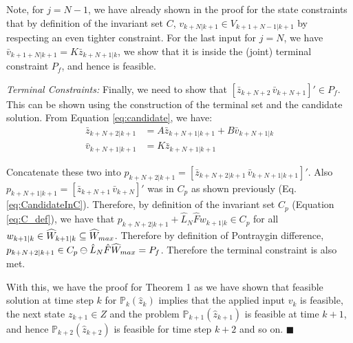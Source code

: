 Note,  for $j=N-1$, we have already shown in the proof for the state constraints that by definition of the invariant set $C$, $v_{k+N|k+1} \in {V}_{k+1+N-1|k+1}$ by respecting an even tighter constraint.
For the last input for $j=N$, we have $\bar{v}_{k+1+N|k+1}=K\bar{z}_{k+N+1|k}$, we show that it is inside the (joint) terminal constraint $P_f$, and hence is feasible.

\textit{Terminal Constraints:} Finally, we need to show that $[\bar{z}_{k+N+2} \, \bar{v}_{k+N+1}]' \in P_f$. This can be shown using the construction of the terminal set and the candidate solution. From Equation \ref{eq:candidate}, we have:
\begin{subequations}
\begin{align}
\bar{z}_{k+N+2|k+1}&=A\bar{z}_{k+N+1|k+1} + B\bar{v}_{k+N+1|k} \\
\bar{v}_{k+N+1|k+1}&=K\bar{z}_{k+N+1|k+1}
\end{align}
\end{subequations}

Concatenate these two into $p_{k+N+2|k+1} = [\bar{z}_{k+N+2|k+1}\, \bar{v}_{k+N+1|k+1}]'$. Also $p_{k+N+1|k+1} = [\bar{z}_{k+N+1} \,\bar{v}_{k+N}]'$ was in $C_p$ as shown previously (Eq. \ref{eq:CandidateInC}). Therefore, by definition of the invariant set $C_p$ (Equation \ref{eq:C_def}), we have that $p_{k+N+2|k+1} + \hat{L}_N \hat{F} w_{k+1|k}\in C_p$ for all $w_{k+1|k}\in \widehat{W}_{k+1|k} \subseteq \widehat{W}_{max}$. Therefore by definition of Pontraygin difference, $p_{k+N+2|k+1} \in C_p \ominus \hat{L}_N\hat{F}\widehat{W}_{max} = P_f$. Therefore the terminal constraint is also met.

With this, we have the proof for Theorem 1 as we have shown that feasible solution at time step $k$ for $\mathbb{P}_{k}(\hat{z}_{k}) $ implies that the applied input $v_k$ is feasible, the next state $z_{k+1} \in Z$ and the problem $\mathbb{P}_{k+1}(\hat{z}_{k+1}) $ is feasible at time $k+1$, and hence  $\mathbb{P}_{k+2}(\hat{z}_{k+2}) $ is feasible for time step $k+2$ and so on. $\blacksquare$






